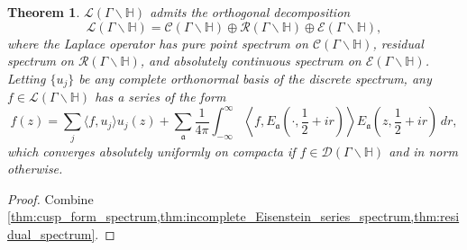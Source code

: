\documentclass[12pt]{book}
\newtheorem{theorem}{Theorem}[section]
\theoremstyle{definition}\newframedtheorem{method}{Method}
\newcommand{\mf}{\mathfrak}
\newcommand{\mc}{\mathcal}
\renewcommand{\H}{\mathbb{H}}
\newcommand{\G}{\Gamma}
\newcommand{\op}{\oplus}
\newcommand{\<}{\langle}
\renewcommand{\>}{\rangle}
\newcommand{\GH}{\G\backslash\H}
\begin{document}
      \begin{theorem}\label{thm:the_full_spectral_resolution}
        $\mc{L}(\GH)$ admits the orthogonal decomposition
        \[
          \mc{L}(\GH) = \mc{C}(\GH) \op \mc{R}(\GH) \op \mc{E}(\GH),
        \]
        where the Laplace operator has pure point spectrum on $\mc{C}(\GH)$, residual spectrum on $\mc{R}(\GH)$, and absolutely continuous spectrum on $\mc{E}(\GH)$. Letting $\{u_{j}\}$ be any complete orthonormal basis of the discrete spectrum, any $f \in \mc{L}(\GH)$ has a series of the form
        \[
          f(z) = \sum_{j}\<f,u_{j}\>u_{j}(z)+\sum_{\mf{a}}\frac{1}{4\pi}\int_{-\infty}^{\infty}\left\<f,E_{\mf{a}}\left(\cdot,\frac{1}{2}+ir\right)\right\>E_{\mf{a}}\left(z,\frac{1}{2}+ir\right)\,dr,
        \]
        which converges absolutely uniformly on compacta if $f \in \mc{D}(\GH)$ and in norm otherwise.
      \end{theorem}
      \begin{proof}
        Combine \cref{thm:cusp_form_spectrum,thm:incomplete_Eisenstein_series_spectrum,thm:residual_spectrum}.
      \end{proof}
\end{document}
